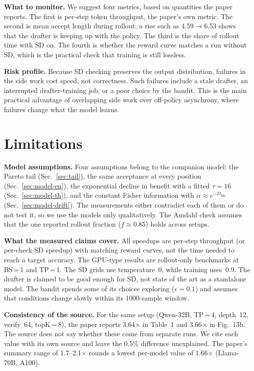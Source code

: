 \documentclass[conference]{IEEEtran}
\newcommand{\x}{\ensuremath{\times}}
\begin{document}
\textbf{What to monitor.} We suggest four metrics, based on quantities the paper reports. The first is per-step token throughput, the paper's own metric. The second is mean accept length during rollout; a rise such as 4.59$\to$6.53 shows that the drafter is keeping up with the policy. The third is the share of rollout time with SD on. The fourth is whether the reward curve matches a run without SD, which is the practical check that training is still lossless.

\textbf{Risk profile.} Because SD checking preserves the output distribution, failures in the side work cost speed, not correctness. Such failures include a stale drafter, an interrupted drafter-training job, or a poor choice by the bandit. This is the main practical advantage of overlapping side work over off-policy asynchrony, where failures change what the model learns.

\section{Limitations}
\label{sec:threats}

\textbf{Model assumptions.} Four assumptions belong to the companion model: the Pareto tail (Sec.~\ref{sec:tail}), the same acceptance at every position (Sec.~\ref{sec:model-en}), the exponential decline in benefit with a fitted $\tau=16$ (Sec.~\ref{sec:model-th}), and the constant Fisher information with $\alpha\approx e^{-D_{\mathrm{KL}}}$ (Sec.~\ref{sec:model-drift}). The measurements either contradict each of them or do not test it, so we use the models only qualitatively. The Amdahl check assumes that the one reported rollout fraction ($f\approx0.85$) holds across setups.

\textbf{What the measured claims cover.} All speedups are per-step throughput (or per-check SD speedup) with matching reward curves, not the time needed to reach a target accuracy. The GPU-type results are rollout-only benchmarks at BS\,=\,1 and TP\,=\,1. The SD grids use temperature~0, while training uses~0.9. The drafter is claimed to be good enough for SD, not state of the art as a standalone model. The bandit spends some of its choices exploring ($\epsilon=0.1$) and assumes that conditions change slowly within its 1000-sample window.

\textbf{Consistency of the source.} For the same setup (Qwen-32B, TP\,=\,4, depth~12, verify~64, topK\,=\,8), the paper reports 3.64\x{} in Table~1 and 3.66\x{} in Fig.~13b. The source does not say whether these come from separate runs. We cite each value with its own source and leave the 0.5\% difference unexplained. The paper's summary range of 1.7--2.1\x{} rounds a lowest per-model value of 1.66\x{} (Llama-70B, A100).
\end{document}
